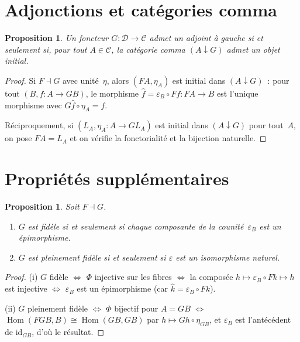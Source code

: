 \documentclass[a4paper,12pt]{book}
\DeclareMathOperator{\Hom}{Hom}
\newcommand{\id}{\mathrm{id}}
\newtheorem{proposition}[theoreme]{Proposition}
\begin{document}
\section{Adjonctions et catégories comma}\label{sec:adj-comma}

\begin{proposition}\label{prop:adj-objet-initial-comma}
Un foncteur $G\colon\mathcal{D}\to\mathcal{C}$ admet un adjoint à gauche
si et seulement si, pour tout $A\in\mathcal{C}$, la catégorie comma
$(A\downarrow G)$ admet un objet initial.
\end{proposition}

\begin{proof}
Si $F\dashv G$ avec unité~$\eta$, alors $(FA,\eta_A)$ est initial
dans $(A\downarrow G)$~: pour tout $(B,f\colon A\to GB)$, le morphisme
$\hat{f}=\varepsilon_B\circ Ff\colon FA\to B$ est l'unique morphisme
avec $G\hat{f}\circ\eta_A = f$.

Réciproquement, si $(L_A,\eta_A\colon A\to GL_A)$ est initial dans
$(A\downarrow G)$ pour tout~$A$, on pose $FA=L_A$ et on vérifie
la fonctorialité et la bijection naturelle.
\end{proof}


\section{Propriétés supplémentaires}\label{sec:adj-proprietes}

\begin{proposition}\label{prop:adj-pleinement-fidele}
Soit $F\dashv G$.
\begin{enumerate}[label=(\roman*)]
\item $G$ est fidèle si et seulement si chaque composante de la
      counité~$\varepsilon_B$ est un épimorphisme.
\item $G$ est pleinement fidèle si et seulement si $\varepsilon$
      est un isomorphisme naturel.
\end{enumerate}
\end{proposition}

\begin{proof}
(i) $G$ fidèle $\Leftrightarrow$ $\Phi$ injective sur les fibres
$\Leftrightarrow$ la composée $h\mapsto\varepsilon_B\circ Fk\mapsto h$
est injective
$\Leftrightarrow$ $\varepsilon_B$ est un épimorphisme (car $\hat{k}=\varepsilon_B\circ Fk$).

(ii) $G$ pleinement fidèle $\Leftrightarrow$ $\Phi$ bijectif pour $A=GB$
$\Leftrightarrow$ $\Hom(FGB,B)\cong\Hom(GB,GB)$ par $h\mapsto Gh\circ\eta_{GB}$,
et $\varepsilon_B$ est l'antécédent de $\id_{GB}$, d'où le résultat.
\end{proof}
\end{document}
